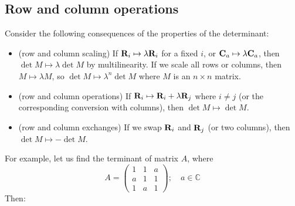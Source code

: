 \subsection{Row and column operations}
Consider the following consequences of the properties of the determinant:
\begin{itemize}
	\item (row and column scaling) If \(\vb R_i \mapsto \lambda \vb R_i\) for a fixed \(i\), or \(\vb C_a \mapsto \lambda \vb C_a\), then \(\det M \mapsto \lambda \det M\) by multilinearity.
	      If we scale all rows or columns, then \(M \mapsto \lambda M\), so \(\det M \mapsto \lambda^n \det M\) where \(M\) is an \(n \times n\) matrix.
	\item (row and column operations) If \(\vb R_i \mapsto \vb R_i + \lambda \vb R_j\) where \(i \neq j\) (or the corresponding conversion with columns), then \(\det M \mapsto \det M\).
	\item (row and column exchanges) If we swap \(\vb R_i\) and \(\vb R_j\) (or two columns), then \(\det M \mapsto -\det M\).
\end{itemize}
For example, let us find the terminant of matrix \(A\), where
\[
	A = \begin{pmatrix}
		1 & 1 & a \\ a & 1 & 1 \\ 1 & a & 1
	\end{pmatrix};\quad a \in \mathbb C
\]
Then:
